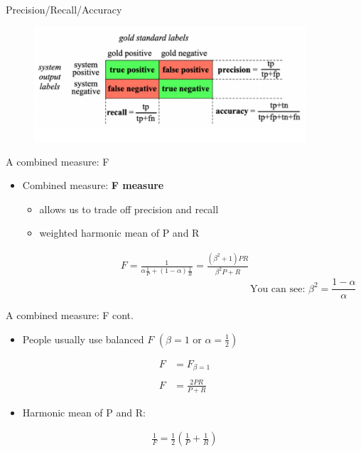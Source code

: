 \documentclass[serif, aspectratio=169]{beamer}
\begin{document}
\begin{frame}{Precision/Recall/Accuracy}
    \begin{figure}[h]
            \centering
            
            \includegraphics[width=0.9\textwidth]{pic/rePreAcc.png}
            \end{figure}
\end{frame}
\begin{frame}{A combined measure: F}
    \begin{itemize}
        \item Combined measure: \textbf{F measure}
        \begin{itemize}
            \item allows us to trade off precision and recall
            \item weighted harmonic mean of P and R
        \end{itemize}
    \end{itemize}
    \begin{align*}
        F = \frac{1}{\alpha \frac{1}{P} + (1-\alpha)\frac{1}{R}} = \frac{(\beta^2 + 1)PR}{\beta^2P + R}
    \end{align*}
    \[
        \hspace{10cm} \text{You can see: } \beta^2 = \frac{1-\alpha}{\alpha}
    \]
    
\end{frame}
\begin{frame}{A combined measure: F cont.}
    \begin{itemize}
        \item People usually use balanced $F$ $(\beta=1 \text{ or } \alpha=\frac{1}{2})$
    \end{itemize}
    \begin{align*}
        F &= F_{\beta=1} \\
        &\\
        F &= \frac{2PR}{P + R}
    \end{align*}
    \begin{itemize}
        \item Harmonic mean of P and R: 
    \end{itemize}
    \begin{align*}
        \frac{1}{F}=\frac{1}{2}(\frac{1}{P}+\frac{1}{R})
    \end{align*}
\end{frame}
\end{document}
